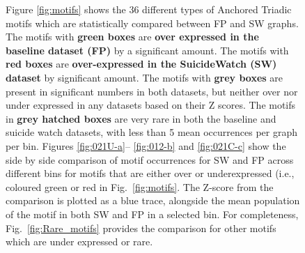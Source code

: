 \begin{figure}
    
\caption{
Figure \ref{fig:motifs} shows the 36 different types of Anchored Triadic motifs which are statistically compared between FP and SW graphs. The motifs with \textbf{green boxes} are \textbf{over expressed in the baseline dataset (FP)} by a significant amount. The motifs with \textbf{red boxes} are \textbf{over-expressed in the SuicideWatch (SW) dataset} by significant amount. The motifs with \textbf{grey boxes} are present in significant numbers in both datasets, but neither over nor under expressed in any datasets based on their Z scores. The motifs in \textbf{grey hatched boxes} are very rare in both the baseline and suicide watch datasets, with less than 5 mean occurrences per graph per bin.
Figures \ref{fig:021U-a}--%
\ref{fig:012-b}  and \ref{fig:021C-c} show the side by side comparison of motif occurrences for SW and FP across different bins for motifs that are either over or underexpressed (i.e., coloured green or red in Fig.~\ref{fig:motifs}. The Z-score from the comparison is plotted as a blue trace, alongside the mean population of the motif in both SW and FP in a selected bin. For completeness, Fig.~\ref{fig:Rare_motifs} provides the comparison for other motifs which are under expressed or rare.}
\label{Fig:motif_expressed}
\end{figure}